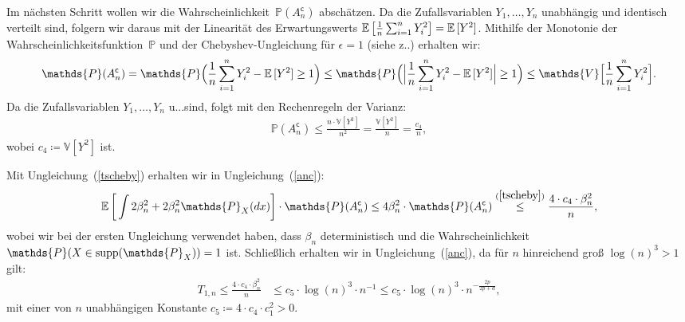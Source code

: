 Im nächsten Schritt wollen wir die Wahrscheinlichkeit~$\mathds{P}(A_n^{\mathsf{c}})$ abschätzen.
Da die Zufallsvariablen $Y_1,\dots,Y_n$ unabhängig und identisch verteilt sind, 
folgern wir daraus mit der Linearität des Erwartungswerts $\mathbb{E}\,\big[\frac{1}{n} \sum_{i = 1}^n Y_i^2\big] = \mathbb{E}\,[Y^2]$.
Mithilfe der Monotonie der Wahrscheinlichkeitsfunktion~$\mathds{P}$ und der Chebyshev-Ungleichung für $\epsilon = 1$ (siehe z.\@B.\@ \cite[Satz~5.11]{Klenke2013}) erhalten wir:
\begin{equation*}
\begin{split}
\mathds{P}(A_n^{\mathsf{c}}) = \mathds{P}\Big(\frac{1}{n}\sum_{i=1}^n Y_i^2 - \E[Y^2] \geq 1\Big)
\leq \mathds{P}\Big(\Big|\frac{1}{n}\sum_{i=1}^n Y_i^2 - \E[Y^2]\Big| \geq 1\Big)
\leq \mathds{V}\Big[\frac{1}{n}\sum_{i = 1}^nY_i^2\Big].
\end{split}
\end{equation*}
Da die Zufallsvariablen $Y_1,\dots,Y_n$ u.\@i.\@v.\@ sind, folgt mit den Rechenregeln der Varianz:
\begin{equation}
\label{tscheby}
\begin{split}
\mathds{P}(A_n^{\mathsf{c}}) \leq \frac{n \cdot  \mathds{V}[Y^2]}{n^2}
= \frac{\mathds{V}[Y^2]}{n}
= \frac{c_4}{n},
\end{split}
\end{equation}
wobei $c_4 \coloneqq \mathds{V}[Y^2]$ ist. 

Mit Ungleichung~(\ref{tscheby}) erhalten wir in Ungleichung~(\ref{anc}):
\begin{equation*}
\begin{split}
 \E \bigg[\int  2\beta_n^2 + 2\beta_n^2 \mathds{P}_X(dx)\bigg] \cdot \mathds{P}(A_n^{\mathsf{c}})
  \leq 4\beta_n^2 \cdot \mathds{P}(A_n^{\mathsf{c}}) 
  \stackrel{(\ref{tscheby})}{\leq} \frac{4 \cdot c_4 \cdot \beta_n^2}{n},
\end{split}
\end{equation*}
wobei wir bei der ersten Ungleichung verwendet haben, dass $\beta_n$ deterministisch und die Wahrscheinlichkeit~$\mathds{P}(X \in \supp(\mathds{P}_X)) = 1$ ist.
Schließlich erhalten wir in Ungleichung~(\ref{anc}), da für $n$ hinreichend groß $\log(n)^3 > 1$ gilt:
\begin{equation}
\label{6thsum}
\begin{split}
T_{1,n} \leq \frac{4 \cdot c_4 \cdot \beta_n^2}{n} & \leq c_{5} \cdot \log(n)^3 \cdot n^{-1} \leq c_{5} \cdot \log(n)^3 \cdot n^{- \frac{2p}{2p + d}},
\end{split}
\end{equation} 
mit einer von $n$ unabhängigen Konstante $c_{5} \coloneqq 4 \cdot c_4 \cdot c_1^2 > 0$.

